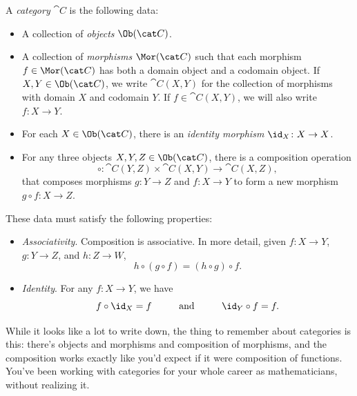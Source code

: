 \documentclass[noname]{notes}
\begin{document}
\begin{definition}
	A \emph{category} $\cat C$ is the following data:
	\begin{itemize}
		\item A collection\footnotemark{} of \emph{objects} $\Ob(\cat C)$.
		\item A collection of \emph{morphisms} $\Mor(\cat C)$ such that each morphism $f \in \Mor(\cat C)$ has both a domain object and a codomain object. If $X, Y \in \Ob(\cat C)$, we write ${\cat C}(X,Y)$\footnotemark{} for the collection of morphisms with domain $X$ and codomain $Y$. If $f \in \cat C(X,Y)$, we will also write $f \colon X \to Y$. 
		\item For each $X \in \Ob(\cat C)$, there is an \emph{identity morphism} $\id_X \colon X \to X$. 
		\item For any three objects $X,Y,Z \in \Ob(\cat C)$, there is a composition operation 
		\[
			\circ \colon \cat C(Y,Z) \times \cat C(X,Y) \to \cat C(X,Z),
		\]
		that composes morphisms $g \colon Y \to Z$ and $f \colon X \to Y$ to form a new morphism $g \circ f \colon X \to Z$. 
	\end{itemize} 
	These data must satisfy the following properties: 
	\begin{itemize}
		\item \emph{Associativity}. Composition is associative. In more detail, given $f \colon X \to Y$, $g \colon Y \to Z$, and $h \colon Z \to W$, 
		\[
			h \circ (g \circ f) = (h \circ g) \circ f. 
		\]
		\item \emph{Identity}. For any $f \colon X \to Y$, we have 
		\[
			f \circ \id_X = f 
			\hspace*{1cm}
			\text{and}
			\hspace*{1cm}
			\id_Y \circ f = f.
		\]
	\end{itemize}
\end{definition}

While it looks like a lot to write down, the thing to remember about categories is this: there's objects and morphisms and composition of morphisms, and the composition works exactly like you'd expect if it were composition of functions. You've been working with categories for your whole career as mathematicians, without realizing it.  
\end{document}
